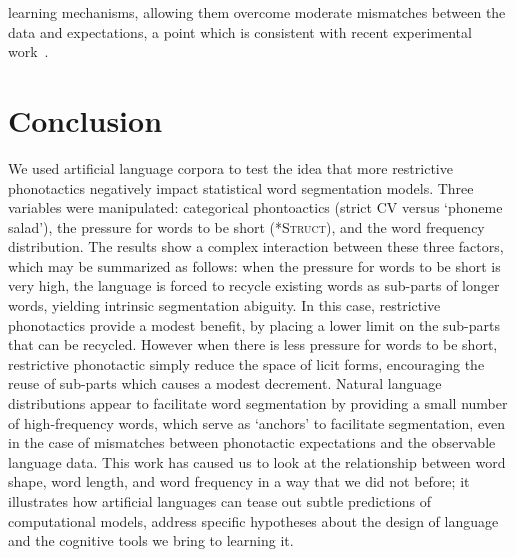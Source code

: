 \documentclass[11pt]{article}
\begin{document}
learning mechanisms, allowing them overcome moderate mismatches between the data and expectations, a point which is consistent with recent experimental work~\cite{Kurumada13a}.

\section{Conclusion}
\vspace*{-5pt}
We used artificial language corpora to test the idea that more restrictive phonotactics negatively impact statistical word segmentation models. Three variables were manipulated: categorical phontoactics (strict CV versus `phoneme salad'), the pressure for words to be short (\textsc{*Struct}), and the word frequency distribution. The results show a complex interaction between these three factors, which may be summarized as follows: when the pressure for words to be short is very high, the language is forced to recycle existing words as sub-parts of longer words, yielding intrinsic segmentation abiguity. In this case, restrictive phonotactics provide a modest benefit, by placing a lower limit on the sub-parts that can be recycled. However when there is less pressure for words to be short, restrictive phonotactic simply reduce the space of licit forms, encouraging the reuse of sub-parts which causes a modest decrement. Natural language distributions appear to facilitate word segmentation by providing a small number of high-frequency words, which serve as `anchors' to facilitate segmentation, even in the case of mismatches between phonotactic expectations and the observable language data. This work has caused us to look at the relationship between word shape, word length, and word frequency in a way that we did not before; it illustrates how artificial languages can tease out subtle predictions of computational models, address specific hypotheses about the design of language and the cognitive tools we bring to learning it.



\end{document}
